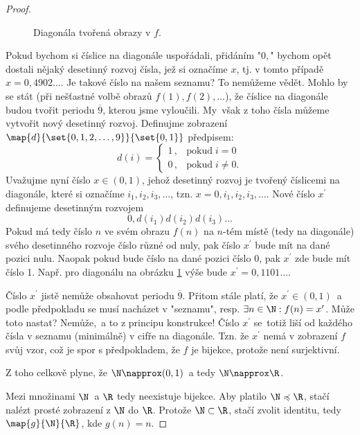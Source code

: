 \begin{proof}
\begin{figure}[H]
        \caption{Diagonála tvořená obrazy v $f$.}
        \label{fig:diagonala_realna_a_prirozena_cisla}
    \end{figure}
    Pokud bychom si číslice na diagonále uspořádali, přidáním "$0,$" bychom opět dostali nějaký desetinný rozvoj čísla, jež si označíme $x$, tj. v tomto případě $x=0,4902\dots$. Je takové číslo na našem seznamu? To nemůžeme vědět. Mohlo by se stát (při nešťastné volbě obrazů $f(1),f(2),\dots$), že číslice na diagonále budou tvořit periodu $\overline{9}$, kterou jsme vyloučili. My~však z toho čísla můžeme vytvořit nový desetinný rozvoj. Definujme zobrazení $\map{d}{\set{0,1,2,\dots,9}}{\set{0,1}}$ předpisem:
    \begin{equation*}
        d(i)=\left\{
        \begin{array}{ll}
            1\,, & \text{pokud}\;i=0\\
            0\,, & \text{pokud}\;i\neq 0.
        \end{array}
        \right.
    \end{equation*}
    Uvažujme nyní číslo $x\in(0,1)$, jehož desetinný rozvoj je tvořený číslicemi na diagonále, které si označíme $i_1,i_2,i_3,\dots$, tzn. $x=0,i_1,i_2,i_3,\dots$. Nové číslo $x^\prime$ definujeme desetinným rozvojem
    \begin{equation*}
        0,d(i_1)d(i_2)d(i_3)\dots
    \end{equation*}
    Pokud má tedy číslo $n$ ve svém obrazu $f(n)$ na $n$-tém místě (tedy na diagonále) svého desetinného rozvoje číslo různé od nuly, pak číslo $x^\prime$ bude mít na dané pozici nulu. Naopak pokud bude číslo na dané pozici číslo 0, pak $x^\prime$ zde bude mít číslo 1. Např. pro diagonálu na obrázku \ref{fig:diagonala_realna_a_prirozena_cisla} výše bude $x^\prime=0,1101\dots$.\par
    Číslo $x^\prime$ jistě nemůže obsahovat periodu $\overline{9}$. Přitom stále platí, že $x^\prime\in(0,1)$~a podle předpokladu se musí nacházet v "seznamu", resp. $\exists n\in\N: f(n)=x^\prime$. Může toto nastat? Nemůže,~a to z principu konstrukce! Číslo $x^\prime$ se~totiž liší od každého čísla v seznamu (minimálně) v cifře na diagonále. Tzn. že $x^\prime$ nemá v zobrazení $f$ svůj vzor, což je spor s předpokladem, že $f$ je bijekce, protože není surjektivní.\par
    Z toho celkově plyne, že $\N\napprox(0,1)$~a tedy $\N\napprox\R$.
    \medskip

    Mezi množinami $\N$~a $\R$ tedy neexistuje bijekce. Aby platilo $\N\preccurlyeq\R$, stačí nalézt prosté zobrazení z $\N$ do $\R$. Protože $\N\subset\R$, stačí zvolit identitu, tedy $\map{g}{\N}{\R}$, kde $g(n)=n$.
\end{proof}
